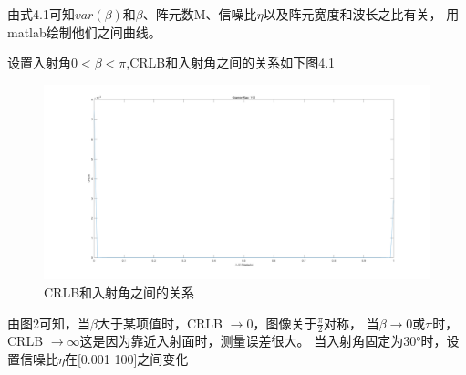 \documentclass[fontset=windows]{article}
\numberwithin{figure}{section}
\begin{document}
由式4.1可知$var(\beta)$和$\beta$、阵元数M、信噪比$\eta$以及阵元宽度和波长之比有关，
用matlab绘制他们之间曲线。

设置入射角$0<\beta<\pi$,CRLB和入射角之间的关系如下图4.1

\begin{figure}[H]
	\centering
	\includegraphics[width=0.75\linewidth]{CRLB 入射角.png}
	\caption{CRLB和入射角之间的关系}
\end{figure}
由图2可知，当$\beta$大于某项值时，CRLB $\to 0$，图像关于$\frac{\pi}{2}$对称，
当$\beta \to 0 或 \pi 时$，CRLB $\to \infty$这是因为靠近入射面时，测量误差很大。
当入射角固定为30°时，设置信噪比$\eta$在[0.001  100]之间变化
\end{document}
